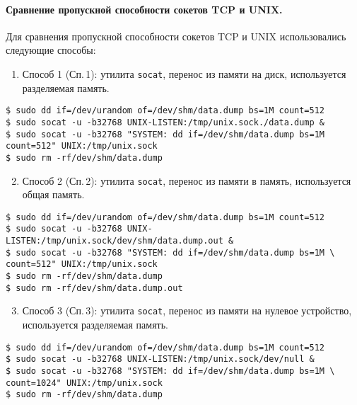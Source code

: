 \paragraph{Сравнение пропускной способности сокетов TCP и UNIX.}

Для сравнения пропускной способности сокетов TCP и UNIX использовались следующие способы:

\begin{enumerate}
\setcounter{enumi}{0}
\item Способ 1 (Сп.\,1): утилита \texttt{socat}, перенос из памяти на диск, используется разделяемая память.
\end{enumerate}

\noindent
\begin{lstlisting}
$ sudo dd if=/dev/urandom of=/dev/shm/data.dump bs=1M count=512
$ sudo socat -u -b32768 UNIX-LISTEN:/tmp/unix.sock./data.dump &
$ sudo socat -u -b32768 "SYSTEM: dd if=/dev/shm/data.dump bs=1M count=512" UNIX:/tmp/unix.sock
$ sudo rm -rf/dev/shm/data.dump
\end{lstlisting}

\begin{enumerate}
\setcounter{enumi}{1}
\item Способ 2 (Сп.\,2): утилита \texttt{socat}, перенос из памяти в память, используется общая память.
\end{enumerate}

\noindent
\begin{lstlisting}
$ sudo dd if=/dev/urandom of=/dev/shm/data.dump bs=1M count=512
$ sudo socat -u -b32768 UNIX-LISTEN:/tmp/unix.sock/dev/shm/data.dump.out &
$ sudo socat -u -b32768 "SYSTEM: dd if=/dev/shm/data.dump bs=1M \
count=512" UNIX:/tmp/unix.sock
$ sudo rm -rf/dev/shm/data.dump
$ sudo rm -rf/dev/shm/data.dump.out
\end{lstlisting}

\begin{enumerate}
\setcounter{enumi}{2}
\item  Способ 3 (Сп.\,3): утилита \texttt{socat}, перенос из памяти на нулевое устройство, используется разделяемая память.
\end{enumerate}

\noindent
\begin{lstlisting}
$ sudo dd if=/dev/urandom of=/dev/shm/data.dump bs=1M count=512
$ sudo socat -u -b32768 UNIX-LISTEN:/tmp/unix.sock/dev/null &
$ sudo socat -u -b32768 "SYSTEM: dd if=/dev/shm/data.dump bs=1M \
count=1024" UNIX:/tmp/unix.sock
$ sudo rm -rf/dev/shm/data.dump
\end{lstlisting}

